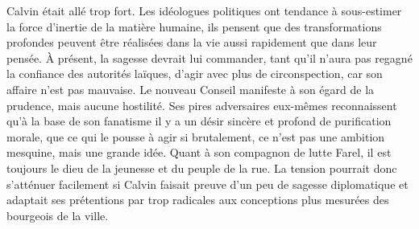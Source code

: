 \documentclass[french,twoside]{book} %
\newcommand{\astermono}{\medskip\centerline{\color{rubric}\large\selectfont{\syms ✻}}\medskip\par}%
\begin{document}
\astermono

\noindent Calvin était allé trop fort. Les idéologues politiques ont tendance à sous-estimer la force d’inertie de la matière humaine, ils pensent que des transformations profondes peuvent être réalisées dans la vie aussi rapidement que dans leur pensée. À présent, la sagesse devrait lui commander, tant qu’il n’aura pas regagné la confiance des autorités laïques, d’agir avec plus de circonspection, car son affaire n’est pas mauvaise. Le nouveau Conseil manifeste à son égard de la prudence, mais aucune hostilité. Ses pires adversaires eux-mêmes reconnaissent qu’à la base de son fanatisme il y a un désir sincère et profond de purification morale, que ce qui le pousse à agir si brutalement, ce n’est pas une ambition mesquine, mais une grande idée. Quant à son compagnon de lutte Farel, il est toujours le dieu de la jeunesse et du peuple de la rue. La tension pourrait donc s’atténuer facilement si Calvin faisait preuve d’un peu de sagesse diplomatique et adaptait ses prétentions par trop radicales aux conceptions plus mesurées des bourgeois de la ville.\par
\end{document}
